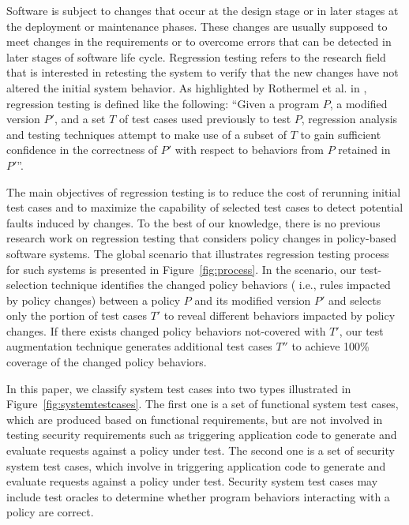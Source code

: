 Software is subject to changes that occur at the design stage or in later stages at the deployment or maintenance phases. These changes are 
usually supposed to meet changes in the requirements or to overcome errors that can be detected in later stages of software life cycle. 
Regression testing refers to the research field that is interested in retesting the system to verify that the new changes have not altered 
the initial system behavior. As highlighted by Rothermel et al. in \cite{Rothermel:1996:ART:235681.235682}, regression testing is defined like the 
following: 
``Given a program $P$, a modified version $P'$, and a set $T$ of test cases used previously to test $P$, regression analysis and testing 
techniques attempt to make use of a subset of $T$ to gain sufficient confidence in the correctness of $P'$ with respect to behaviors from $P$ retained 
in $P'$''.

The main objectives of regression testing is to reduce the cost of rerunning initial test cases and to maximize the capability of 
selected test cases to detect potential faults induced by changes.
To the best of our knowledge, there is no previous research work on regression testing that considers policy changes in policy-based software systems. 
The global scenario that illustrates regression testing process for such systems is presented in Figure~\ref{fig:process}.
In the scenario, our test-selection technique identifies the changed policy behaviors (
i.e., rules impacted by policy changes)
 between a policy $P$ and its modified version $P'$ and selects only the portion of test cases $T'$ to reveal different behaviors
impacted by policy changes. If there exists changed policy behaviors not-covered with $T'$, our test augmentation technique generates additional test cases $T''$  to achieve 100\% coverage of the changed policy behaviors.

In this paper, we classify system test cases into two types illustrated in Figure~\ref{fig:systemtestcases}.
The first one is a set of functional system test cases, which
are produced based on functional requirements, but are not involved in testing security requirements such as triggering application code to generate
and evaluate requests against a policy under test.
The second one is a set of security system test cases, which
involve in triggering application code to generate
and evaluate requests against a policy under test.
Security system test cases may include test oracles
to determine whether program behaviors interacting with a policy
are correct.


